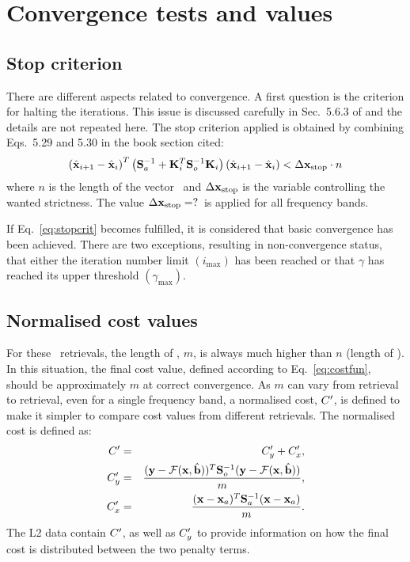 \section{Convergence tests and values}
\label{sec:conv}
%
\subsection{Stop criterion}
There are different aspects related to convergence. A first question is the
criterion for halting the iterations. This issue is discussed carefully in
Sec.~5.6.3 of \citet{rodgers:00} and the details are not repeated here. The
stop criterion applied is obtained by combining Eqs.~5.29 and 5.30 in the
book section cited:
\begin{equation}
  \label{eq:stopcrit}
  \left( \hat{\mathbf{x}}_{i+1} - \hat{\mathbf{x}}_i \right)^T
  \left( \mathbf{S}_{a}^{-1} + 
         \mathbf{K}_{i}^T\mathbf{S}_{o}^{-1}\mathbf{K}_{i} \right)
  \left( \hat{\mathbf{x}}_{i+1} - \hat{\mathbf{x}}_i \right) < \Delta\mathbf{x}_\mathrm{stop} \cdot n
\end{equation}
where $n$ is the length of the vector \SttVct\ and
$\Delta\mathbf{x}_\mathrm{stop}$ is the variable controlling the wanted
strictness. The value $\Delta\mathbf{x}_\mathrm{stop}=?$\ is
applied for all frequency bands. 

If Eq.~\ref{eq:stopcrit} becomes fulfilled, it is considered that basic
convergence has been achieved. There are two exceptions, resulting in
non-convergence status, that either the iteration number limit
$(i_\mathrm{max})$ has been reached or that $\gamma$ has reached its upper
threshold $(\gamma_\mathrm{max})$.
\\


\subsection{Normalised cost values}
%
For these \smr\ retrievals, the length of \MsrVct, $m$, is always much higher
than $n$ (length of \SttVct). In this situation, the final cost value, defined
according to Eq.~\ref{eq:costfun}, should be approximately $m$ at correct
convergence. As $m$ can vary from retrieval to retrieval, even for a single
frequency band, a normalised cost, $C'$, is defined to make it simpler to
compare cost values from different retrievals. The normalised cost is
defined as:
\begin{eqnarray}
  \label{eq:scaledc}
  C' &=& C_y' + C_x', \\
  C_y' &=& \frac{(\mathbf{y}-\mathcal{F}(\mathbf{x},\hat{\mathbf{b}}))^T\mathbf{S}_{o}^{-1}
  (\mathbf{y}-\mathcal{F}(\mathbf{x},\hat{\mathbf{b}}))}{m},\\
  C_x' &=& \frac{(\mathbf{x}-\mathbf{x}_{a})^T\mathbf{S}_{a}^{-1}(\mathbf{x}-\mathbf{x}_{a})}{m}.\\
\end{eqnarray}
The L2 data contain $C'$, as well as $C_y'$ to provide information
on how the final cost is distributed between the two penalty terms.


